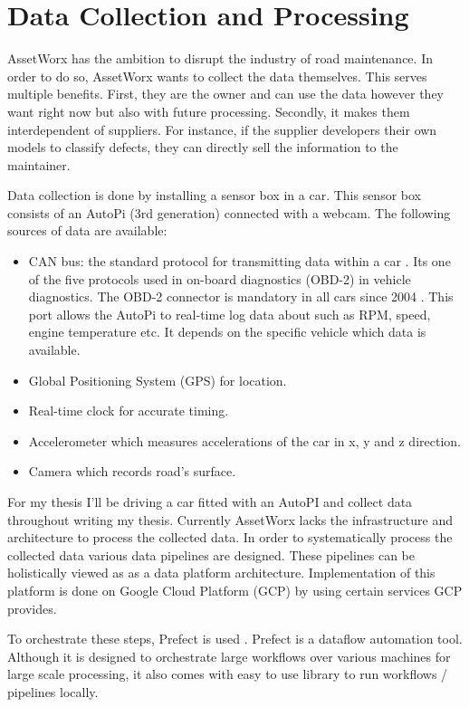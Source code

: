 \clearpage
\section{Data Collection and Processing}

AssetWorx has the ambition to disrupt the industry of road maintenance. In order to do so, AssetWorx wants to collect the data themselves. This serves multiple benefits. First, they are the owner and can use the data however they want right now but also with future processing. Secondly, it makes them interdependent of suppliers. For instance, if the supplier developers their own models to classify defects, they can directly sell the information to the maintainer. 

Data collection is done by installing a sensor box in a car. This sensor box consists of an AutoPi (3rd generation) \cite{AutoPi} connected with a webcam. The following sources of data are available:
\begin{itemize}
\item CAN bus: the standard protocol for transmitting data within a car \cite{ISO11898}. Its one of the five protocols used in on-board diagnostics (OBD-2) in vehicle diagnostics. The OBD-2 connector is mandatory in all cars since 2004 \cite{EU1998}. This port allows the AutoPi to real-time log data about such as RPM, speed, engine temperature etc. It depends on the specific vehicle which data is available.
\item Global Positioning System (GPS) for location.
\item Real-time clock for accurate timing.
\item Accelerometer which measures accelerations of the car in x, y and z direction.
\item Camera which records road's surface.
\end{itemize}

For my thesis I'll be driving a car fitted with an AutoPI and collect data throughout writing my thesis. Currently AssetWorx lacks the infrastructure and architecture to process the collected data. In order to systematically process the collected data various data pipelines are designed. These pipelines can be holistically viewed as as a data platform architecture. Implementation of this platform is done on Google Cloud Platform (GCP) by using certain services GCP provides. 

To orchestrate these steps, Prefect is used \cite{Prefect}. Prefect is a dataflow automation tool. Although it is designed to orchestrate large workflows over various machines for large scale processing, it also comes with easy to use library to run workflows / pipelines locally.


